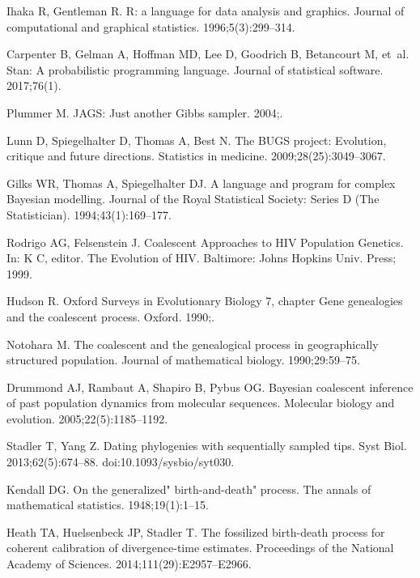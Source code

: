 \documentclass[10pt,letterpaper,table]{article}
\theoremstyle{definition}
\begin{document}
\begin{thebibliography}{10}
Ihaka R, Gentleman R.
\newblock R: a language for data analysis and graphics.
\newblock Journal of computational and graphical statistics.
  1996;5(3):299--314.

Carpenter B, Gelman A, Hoffman MD, Lee D, Goodrich B, Betancourt M, et~al.
\newblock Stan: A probabilistic programming language.
\newblock Journal of statistical software. 2017;76(1).

Plummer M.
\newblock JAGS: Just another Gibbs sampler. 2004;.

Lunn D, Spiegelhalter D, Thomas A, Best N.
\newblock The BUGS project: Evolution, critique and future directions.
\newblock Statistics in medicine. 2009;28(25):3049--3067.

Gilks WR, Thomas A, Spiegelhalter DJ.
\newblock A language and program for complex Bayesian modelling.
\newblock Journal of the Royal Statistical Society: Series D (The
  Statistician). 1994;43(1):169--177.

Rodrigo AG, Felsenstein J.
\newblock Coalescent Approaches to HIV Population Genetics.
\newblock In: K C, editor. The Evolution of HIV. Baltimore: Johns Hopkins Univ.
  Press; 1999.

Hudson R.
\newblock Oxford Surveys in Evolutionary Biology 7, chapter Gene genealogies
  and the coalescent process.
\newblock Oxford. 1990;.

Notohara M.
\newblock The coalescent and the genealogical process in geographically
  structured population.
\newblock Journal of mathematical biology. 1990;29:59--75.

Drummond AJ, Rambaut A, Shapiro B, Pybus OG.
\newblock Bayesian coalescent inference of past population dynamics from
  molecular sequences.
\newblock Molecular biology and evolution. 2005;22(5):1185--1192.

Stadler T, Yang Z.
\newblock Dating phylogenies with sequentially sampled tips.
\newblock Syst Biol. 2013;62(5):674--88.
\newblock doi:{10.1093/sysbio/syt030}.

Kendall DG.
\newblock On the generalized" birth-and-death" process.
\newblock The annals of mathematical statistics. 1948;19(1):1--15.

Heath TA, Huelsenbeck JP, Stadler T.
\newblock The fossilized birth-death process for coherent calibration of
  divergence-time estimates.
\newblock Proceedings of the National Academy of Sciences.
  2014;111(29):E2957--E2966.


\end{thebibliography}
\end{document}
